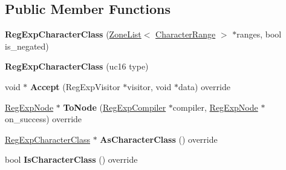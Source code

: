 \subsection*{Public Member Functions}
\begin{DoxyCompactItemize}
\item 
{\bfseries Reg\+Exp\+Character\+Class} (\hyperlink{classv8_1_1internal_1_1_zone_list}{Zone\+List}$<$ \hyperlink{classv8_1_1internal_1_1_character_range}{Character\+Range} $>$ $\ast$ranges, bool is\+\_\+negated)\hypertarget{classv8_1_1internal_1_1_reg_exp_character_class_a6f94c18120f036feb475807ae007acf1}{}\label{classv8_1_1internal_1_1_reg_exp_character_class_a6f94c18120f036feb475807ae007acf1}

\item 
{\bfseries Reg\+Exp\+Character\+Class} (uc16 type)\hypertarget{classv8_1_1internal_1_1_reg_exp_character_class_a4f7c86e1330d0627998f0087c1337384}{}\label{classv8_1_1internal_1_1_reg_exp_character_class_a4f7c86e1330d0627998f0087c1337384}

\item 
void $\ast$ {\bfseries Accept} (Reg\+Exp\+Visitor $\ast$visitor, void $\ast$data) override\hypertarget{classv8_1_1internal_1_1_reg_exp_character_class_adc213a458ec43d1a553adb2e0528ca49}{}\label{classv8_1_1internal_1_1_reg_exp_character_class_adc213a458ec43d1a553adb2e0528ca49}

\item 
\hyperlink{classv8_1_1internal_1_1_reg_exp_node}{Reg\+Exp\+Node} $\ast$ {\bfseries To\+Node} (\hyperlink{classv8_1_1internal_1_1_reg_exp_compiler}{Reg\+Exp\+Compiler} $\ast$compiler, \hyperlink{classv8_1_1internal_1_1_reg_exp_node}{Reg\+Exp\+Node} $\ast$on\+\_\+success) override\hypertarget{classv8_1_1internal_1_1_reg_exp_character_class_a01b0c45fbf9fe6f74f74d4696500600d}{}\label{classv8_1_1internal_1_1_reg_exp_character_class_a01b0c45fbf9fe6f74f74d4696500600d}

\item 
\hyperlink{classv8_1_1internal_1_1_reg_exp_character_class}{Reg\+Exp\+Character\+Class} $\ast$ {\bfseries As\+Character\+Class} () override\hypertarget{classv8_1_1internal_1_1_reg_exp_character_class_aaf0ba1148e04f1875b42f5493383356d}{}\label{classv8_1_1internal_1_1_reg_exp_character_class_aaf0ba1148e04f1875b42f5493383356d}

\item 
bool {\bfseries Is\+Character\+Class} () override\hypertarget{classv8_1_1internal_1_1_reg_exp_character_class_abd6e8ece4b15e332a4f77e528516651f}{}\label{classv8_1_1internal_1_1_reg_exp_character_class_abd6e8ece4b15e332a4f77e528516651f}


\end{DoxyCompactItemize}
